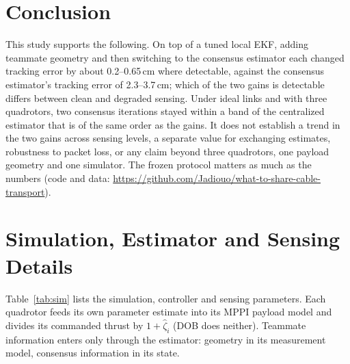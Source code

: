 \documentclass[conference]{IEEEtran}
\begin{document}
\section{Conclusion}
This study supports the following. On top of a tuned local EKF, adding teammate geometry and then switching to the consensus estimator each changed tracking error by about 0.2--0.65\,cm where detectable, against the consensus estimator's tracking error of 2.3--3.7\,cm; which of the two gains is detectable differs between clean and degraded sensing. Under ideal links and with three quadrotors, two consensus iterations stayed within a band of the centralized estimator that is of the same order as the gains. It does not establish a trend in the two gains across sensing levels, a separate value for exchanging estimates, robustness to packet loss, or any claim beyond three quadrotors, one payload geometry and one simulator. The frozen protocol matters as much as the numbers (code and data: \url{https://github.com/Jadiouo/what-to-share-cable-transport}).




\appendices

\section{Simulation, Estimator and Sensing Details}\label{app:sim}
Table~\ref{tab:sim} lists the simulation, controller and sensing parameters. Each quadrotor feeds its own parameter estimate into its MPPI payload model and divides its commanded thrust by $1{+}\hat\zeta_i$ (DOB does neither). Teammate information enters only through the estimator: geometry in its measurement model, consensus information in its state.
\end{document}
